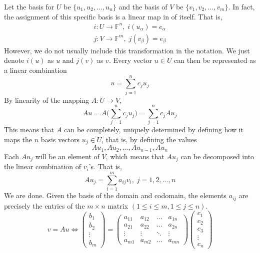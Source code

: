 \documentclass{article}
\begin{document}
    Let the basis for $U$ be $\{ u_1, u_2, ..., u_n\}$ and the basis of $V$ be $\{v_1, v_2, ..., v_m\}$. In fact, the assignment of this specific basis is a linear map in of itself. That is, 
    \begin{align*}
      i: U \longrightarrow \mathbb{F}^n, \; i(u_\alpha) = e_\alpha  \\
      j: V \longrightarrow \mathbb{F}^m, \; j(v_\beta) = e_\beta 
    \end{align*}
    However, we do not usually include this transformation in the notation. We just denote $i(u)$ as $u$ and $j(v)$ as $v$. Every vector $u \in U$ can then be represented as a linear combination
    \begin{equation}
      u = \sum_{j=1}^n c_j u_j
    \end{equation}
    By linearity of the mapping $A: U \longrightarrow V$, 
    \begin{equation}
      A u = A \bigg( \sum_{j=1}^n c_j u_j \bigg) = \sum_{j=1}^n c_j A u_j 
    \end{equation}
    This means that $A$ can be completely, uniquely determined by defining how it maps the $n$ basis vectors $u_j \in U$, that is, by defining the values 
    \begin{equation}
      A u_1, A u_2, ..., A u_{n-1}, A u_n
    \end{equation}
    Each $A u_j$ will be an element of $V$, which means that $A u_j$ can be decomposed into the linear combination of $v_i$'s. That is, 
    \begin{equation}
      A u_j = \sum_{i=1}^m a_{i j} v_i, \; j = 1, 2, ..., n 
    \end{equation}
    We are done. Given the basis of the domain and codomain, the elements $a_{i j}$ are precisely the entries of the $m \times n$ matrix $(1 \leq i \leq m, 1 \leq j \leq n)$. 
    \begin{equation}
      v = A u \iff 
      \begin{pmatrix}
       b_1 \\ b_2 \\ \vdots \\ b_m
      \end{pmatrix}
      = \begin{pmatrix}
       a_{1 1} & a_{1 2} & \ldots & a_{1 n} \\
       a_{2 1} & a_{2 2} & \ldots & a_{2 n} \\
       \vdots & \vdots & \ddots & \vdots \\
       a_{m 1} & a_{m 2} & \ldots & a_{m n} 
      \end{pmatrix} \begin{pmatrix}
       c_1 \\ c_2 \\ c_3 \\ \vdots \\ c_n
      \end{pmatrix}
    \end{equation}
\end{document}
